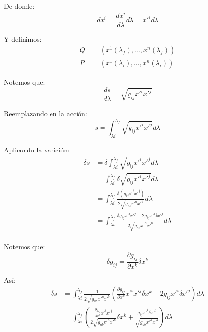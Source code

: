 \documentclass[12pt]{report}
\begin{document}
De donde:
	\begin{equation*}
		dx^{i} = \frac{dx^{i}}{d\lambda} d\lambda = x'^{i}d\lambda
	\end{equation*}
	
Y definimos:
	\begin{align*}
		Q &= \left( x^{1} \left(\lambda_{f} \right) ,...,  x^{n} \left(\lambda_{f} \right) \right) \\
		P &= \left( x^{1} \left(\lambda_{i} \right) ,...,  x^{n} \left(\lambda_{i} \right) \right)
	\end{align*}
	
Notemos que:
	\begin{equation*}
		\frac{ds}{d\lambda} = \sqrt{g_{ij}x'^{i}x'^{j}}
	\end{equation*}

Reemplazando en la acci\'on:
	\begin{equation*}
		s = \int^{\lambda_{f}}_{\lambda{i}} \sqrt{g_{ij}x'^{i}x'^{j}} d\lambda
	\end{equation*}

Aplicando la varici\'on:
	\begin{align*}
		\delta s &= \delta\int^{\lambda_{f}}_{\lambda{i}} \sqrt{g_{ij}x'^{i}x'^{j}} d\lambda \\
				 &= \int^{\lambda_{f}}_{\lambda{i}} \delta \sqrt{g_{ij}x'^{i}x'^{j}} d\lambda \\
				 &= \int^{\lambda_{f}}_{\lambda{i}} \frac{\delta\left( g_{ij}x'^{i}x'^{j} \right)}{2\sqrt{g_{ab}x'^{a}x'^{b}}} d\lambda \\
				 &= \int^{\lambda_{f}}_{\lambda{i}} \frac{\delta g_{ij}x'^{i}x'^{j} + 2g_{ij}x'^{i}\delta x'^{j}}{2\sqrt{g_{ab}x'^{a}x'^{b}}} d\lambda \\
	\end{align*}
	
Notemos que:
	\begin{equation*}
		\delta g_{ij} = \frac{\partial g_{ij}}{\partial x^{k}} \delta x^{k}
	\end{equation*}
	
As\'i: 
	\begin{align*}
		\delta s &= \int^{\lambda_{f}}_{\lambda{i}} \frac{1}{2\sqrt{g_{ab}x'^{a}x'^{b}}} \left(  \frac{\partial g_{ij}}{\partial x^{k}}x'^{i}x'^{j} \delta x^{k} + 2g_{ij}x'^{i}\delta x'^{j} \right) d\lambda \\
				 &= \int^{\lambda_{f}}_{\lambda{i}} \left( \frac{\frac{\partial g_{ij}}{\partial x^{k}}x'^{i}x'^{j}}{2\sqrt{g_{ab}x'^{a}x'^{b}}} \delta x^{k}
				                                        +  \frac{g_{ij}x'^{i}\delta x'^{j}}{\sqrt{g_{ab}x'^{a}x'^{b}}} \right) d\lambda 
	\end{align*}
\end{document}
